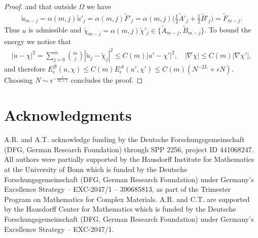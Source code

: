 \documentclass[a4paper, 10pt, twoside, notitlepage]{amsart}
\theoremstyle{plain}
\newcommand{\A}{\mathcal{A}}
\begin{document}
\begin{proof}
                    and that outside $\Omega$ we have
                    \begin{align*}
                      \tilde{u}_{m-j} = \alpha(m,j)  \tilde{u}'_j = \alpha(m,j) \tilde{F}'_j = \alpha(m,j) \Big( \frac{1}{2} \tilde{A}'_j + \frac{1}{2} \tilde{B}'_j \Big) =  \tilde{F}_{m-j}.
                    \end{align*}
                    Thus $u$ is admissible and $\tilde{\chi}_{m-j} = \alpha(m,j) \tilde{\chi}'_j \in \{\tilde{A}_{m-j},\tilde{B}_{m-j}\}$.
                    To bound the energy we notice that
                    \begin{align*}
                      |u-\chi|^2 = \sum_{j=0}^m \binom{m}{j} |\tilde{u}_j - \tilde{\chi}_j|^2 \leq C(m) |u'-\chi'|^2, \quad |\nabla \chi| \leq C(m) |\nabla \chi'|,
                    \end{align*}
                    and therefore $E_\epsilon^{\mathcal{B}}(u,\chi) \leq C(m) E_\epsilon^{\A}(u',\chi') \leq C(m) (N^{-2L} + \epsilon N)$.
                    Choosing $N \sim \epsilon^{-\frac{1}{2L+1}}$ concludes the proof.
                  \end{proof}
                  
        

                  \section*{Acknowledgments}
                  A.R. and A.T. acknowledge funding by the Deu\-tsche For\-schungs\-ge\-mein\-schaft (DFG, German Research Foundation) through SPP 2256, pro\-ject ID 441068247. 
                  All authors were partially supported by the Hausdorff Institute for Mathematics at the University of Bonn which is funded by the Deutsche Forschungsgemeinschaft (DFG, German Research Foundation) under Germany's Excellence Strategy – EXC-2047/1 – 390685813, as part of the Trimester Program on Mathematics for Complex Materials. A.R. and C.T. are supported by the Hausdorff Center for Mathematics which is funded by the Deutsche Forschungsgemeinschaft (DFG, German Research Foundation) under Germany's Excellence Strategy – EXC-2047/1.
              
		 
		
	
\end{document}
